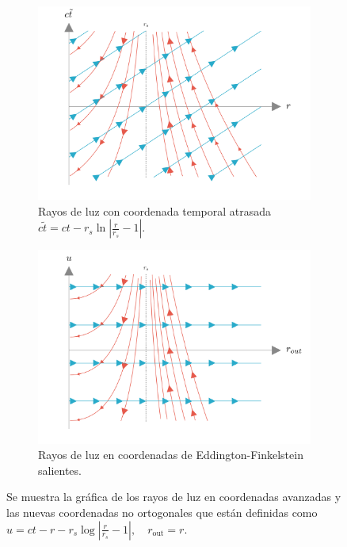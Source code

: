 \begin{figure}[H] 
    \centering 
    \begin{subfigure}{0.48\textwidth} 
        \includegraphics[width=\linewidth]{AgujerosNegros/Schwarzschild/media/images/EddingtonFinkelsteinOutgoingLight_ManimCE_v0.19.0.png}
        \caption{Rayos de luz con coordenada temporal atrasada $ c \tilde{t} = ct - r_s \ln \left| \frac{r}{r_s} - 1 \right|$.}
    \end{subfigure}
    \hfill 
    \begin{subfigure}{0.48\textwidth} 
        \includegraphics[width=\linewidth]{AgujerosNegros/Schwarzschild/media/images/EddingtonFinkelsteinUR_ManimCE_v0.19.0.png} 
        \caption{Rayos de luz en coordenadas de Eddington-Finkelstein salientes.}
    \end{subfigure}
    \caption{Se muestra la gráfica de los rayos de luz en coordenadas avanzadas y las nuevas coordenadas no ortogonales que están definidas como $u = ct - r - r_s \log \left| \frac{r}{r_s} - 1 \right|, \quad r_{\text{out}} = r$.}
\end{figure}

